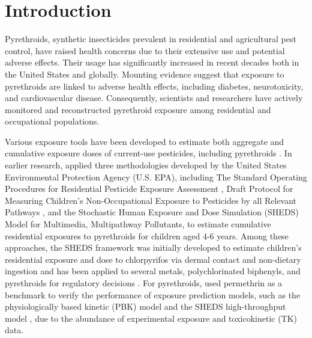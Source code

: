 \documentclass[toxics,article,submit,pdftex,moreauthors]{Definitions/mdpi}
\begin{document}
\section{Introduction}\label{introduction}

Pyrethroids, synthetic insecticides prevalent in residential and
agricultural pest control, have raised health concerns due to their
extensive use and potential adverse effects. Their usage has
significantly increased in recent decades both in the United States and
globally. Mounting evidence suggest that exposure to pyrethroids are
linked to adverse health effects, including diabetes, neurotoxicity, and
cardiovascular disease. Consequently, scientists and researchers have
actively monitored and reconstructed pyrethroid exposure among
residential and occupational populations.

Various exposure tools have been developed to estimate both aggregate
and cumulative exposure doses of current-use pesticides, including
pyrethroids
\citep{tulve2011methodologies, zartarian2012quantifying, xue2014epa}. In
earlier research, \citet{tulve2011methodologies} applied three
methodologies developed by the United States Environmental Protection
Agency (U.S. EPA), including The Standard Operating Procedures for
Residential Pesticide Exposure Assessment \citep{us2012standard}, Draft
Protocol for Measuring Children's Non-Occupational Exposure to
Pesticides by all Relevant Pathways \citep{us2001draft}, and the
Stochastic Human Exposure and Dose Simulation (SHEDS) Model for
Multimedia, Multipathway Pollutants, to estimate cumulative residential
exposures to pyrethroids for children aged 4-6 years. Among these
approaches, the SHEDS framework was initially developed to estimate
children's residential exposure and dose to chlorpyrifos via dermal
contact and non-dietary ingestion \citep{zartarian2000modeling} and has
been applied to several metals, polychlorinated biphenyls, and
pyrethroids for regulatory decisions
\citep{tulve2011methodologies, xue2015modeling, zartarian2017children}.
For pyrethroids, \citet{zartarian2012quantifying} used permethrin as a
benchmark to verify the performance of exposure prediction models, such
as the physiologically based kinetic (PBK) model
\citep{tornero2012pharmacokinetic} and the SHEDS high-throughput model
\citep{isaacs2014sheds}, due to the abundance of experimental exposure
and toxicokinetic (TK) data.
\end{document}
